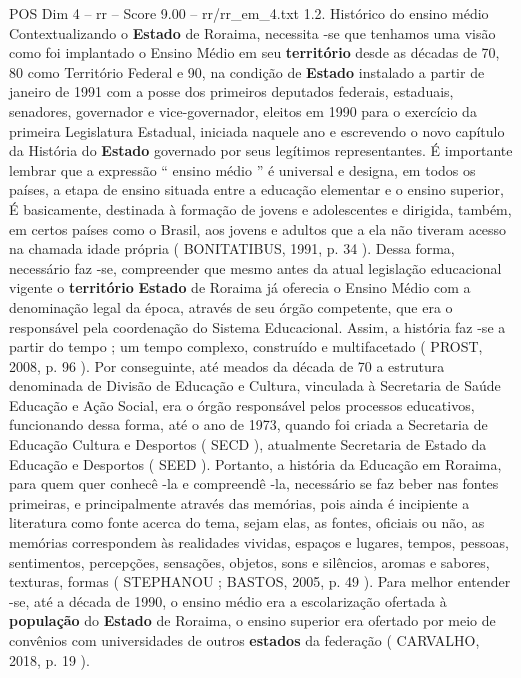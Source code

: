 \begin{textsample}{POS Dim 4 – rr – Score 9.00 – rr/rr\_em\_4.txt}  \label{ex:f4_pos_119}
1.2.
Histórico do ensino médio Contextualizando o \textbf{Estado} de Roraima, necessita -se que tenhamos uma visão como foi implantado o Ensino Médio em seu \textbf{território} desde as décadas de 70, 80 como Território Federal e 90, na condição de \textbf{Estado} instalado a partir de janeiro de 1991 com a posse dos primeiros deputados federais, estaduais, senadores, governador e vice-governador, eleitos em 1990 para o exercício da primeira Legislatura Estadual, iniciada naquele ano e escrevendo o novo capítulo da História do \textbf{Estado} governado por seus legítimos representantes.
É importante lembrar que a expressão “ ensino médio ” é universal e designa, em todos os países, a etapa de ensino situada entre a educação elementar e o ensino superior, É basicamente, destinada à formação de jovens e adolescentes e dirigida, também, em certos países como o Brasil, aos jovens e adultos que a ela não tiveram acesso na chamada idade própria ( BONITATIBUS, 1991, p. 34 ).
Dessa forma, necessário faz -se, compreender que mesmo antes da atual legislação educacional vigente o \textbf{território} \textbf{Estado} de Roraima já oferecia o Ensino Médio com a denominação legal da época, através de seu órgão competente, que era o responsável pela coordenação do Sistema Educacional.
Assim, a história faz -se a partir do tempo ; um tempo complexo, construído e multifacetado ( PROST, 2008, p. 96 ).
Por conseguinte, até meados da década de 70 a estrutura denominada de Divisão de Educação e Cultura, vinculada à Secretaria de Saúde Educação e Ação Social, era o órgão responsável pelos processos educativos, funcionando dessa forma, até o ano de 1973, quando foi criada a Secretaria de Educação Cultura e Desportos ( SECD ), atualmente Secretaria de Estado da Educação e Desportos ( SEED ).
Portanto, a história da Educação em Roraima, para quem quer conhecê -la e compreendê -la, necessário se faz beber nas fontes primeiras, e principalmente através das memórias, pois ainda é incipiente a literatura como fonte acerca do tema, sejam elas, as fontes, oficiais ou não, as memórias correspondem às realidades vividas, espaços e lugares, tempos, pessoas, sentimentos, percepções, sensações, objetos, sons e silêncios, aromas e sabores, texturas, formas ( STEPHANOU ; BASTOS, 2005, p. 49 ).
Para melhor entender -se, até a década de 1990, o ensino médio era a escolarização ofertada à \textbf{população} do \textbf{Estado} de Roraima, o ensino superior era ofertado por meio de convênios com universidades de outros \textbf{estados} da federação ( CARVALHO, 2018, p. 19 ).

\end{textsample}
